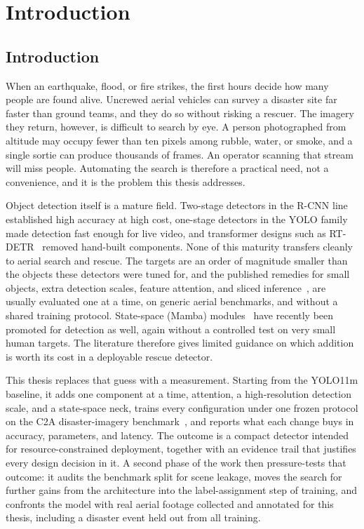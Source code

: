 \chapter{Introduction}

\section{Introduction}
When an earthquake, flood, or fire strikes, the first hours decide how many
people are found alive. Uncrewed aerial vehicles can survey a disaster site far
faster than ground teams, and they do so without risking a rescuer. The imagery
they return, however, is difficult to search by eye. A person photographed from
altitude may occupy fewer than ten pixels among rubble, water, or smoke, and a
single sortie can produce thousands of frames. An operator scanning that stream
will miss people. Automating the search is therefore a practical need, not a
convenience, and it is the problem this thesis addresses.

Object detection itself is a mature field. Two-stage detectors in the R-CNN
line~\cite{ren2015fasterrcnn} established high accuracy at high cost, one-stage
detectors in the YOLO family~\cite{redmon2016yolo, jocher2024yolo11} made
detection fast enough for live video, and transformer designs such as
RT-DETR~\cite{zhao2024rtdetr} removed hand-built components. None of this
maturity transfers cleanly to aerial search and rescue. The targets are an
order of magnitude smaller than the objects these detectors were tuned for,
and the published remedies for small objects, extra detection scales, feature
attention, and sliced inference~\cite{akyon2022sahi}, are usually evaluated one
at a time, on generic aerial benchmarks, and without a shared training
protocol. State-space (Mamba) modules~\cite{gu2023mamba} have recently been
promoted for detection as well, again without a controlled test on very small
human targets. The literature therefore gives limited guidance on which
addition is worth its cost in a deployable rescue detector.

This thesis replaces that guess with a measurement. Starting from the YOLO11m
baseline, it adds one component at a time, attention, a high-resolution
detection scale, and a state-space neck, trains every configuration under one
frozen protocol on the C2A disaster-imagery benchmark~\cite{nihal2024c2a}, and
reports what each change buys in accuracy, parameters, and latency. The outcome
is a compact detector intended for resource-constrained deployment, together with an
evidence trail that justifies every design decision in it. A second phase of
the work then pressure-tests that outcome: it audits the benchmark split for
scene leakage, moves the search for further gains from the architecture into
the label-assignment step of training, and confronts the model with real
aerial footage collected and annotated for this thesis, including a disaster
event held out from all training.

